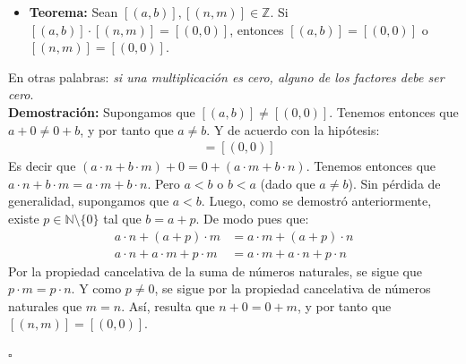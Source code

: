 \documentclass[10 pt]{article}
\begin{document}
\begin{itemize}
    \item \Large{\textbf{Teorema:} Sean $[(a,b)],[(n,m)] \in \mathbb Z$. Si $[(a,b)] \cdot [(n,m)]=[(0,0)]$, entonces $[(a,b)]=[(0,0)]$ o $[(n,m)]=[(0,0)]$.} \\
\end{itemize}

\Large{En otras palabras: \textit{si una multiplicación es cero, alguno de los factores debe ser cero}.} \\

\Large{\textbf{Demostración:} Supongamos que $[(a,b)] \neq [(0,0)]$. Tenemos entonces que $a+0 \neq 0+b$, y por tanto que $a \neq b$. Y de acuerdo con la hipótesis:}
\begin{align*}
    [(a \cdot n+b \cdot m,a \cdot m+b \cdot n)]&=[(0,0)] 
\end{align*}
\Large{Es decir que $(a \cdot n+b \cdot m)+0=0+(a \cdot m+b \cdot n)$. Tenemos entonces que $a \cdot n+b \cdot m=a \cdot m+b \cdot n$. Pero $a<b$ o $b<a$ (dado que $a \neq b$). Sin pérdida de generalidad, supongamos que $a<b$. Luego, como se demostró anteriormente, existe $p \in \mathbb N \setminus \{0\}$ tal que $b=a+p$. De modo pues que:}
\begin{align*}
    a \cdot n+(a+p) \cdot m&=a \cdot m+(a+p) \cdot n \\
    a \cdot n+a \cdot m+p \cdot m&=a \cdot m+a \cdot n+p \cdot n
\end{align*}
\Large{Por la propiedad cancelativa de la suma de números naturales, se sigue que $p \cdot m=p \cdot n$. Y como $p \neq 0$, se sigue por la propiedad cancelativa de números naturales que $m=n$. Así, resulta que $n+0=0+m$, y por tanto que $[(n,m)]=[(0,0)]$.} \\

\begin{flushright}
    $\square$
\end{flushright}
\end{document}
